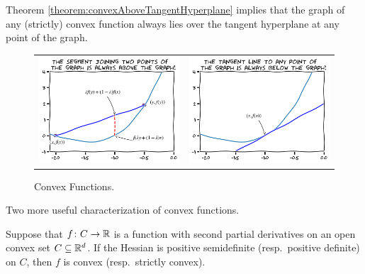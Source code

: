 \begin{remark}
Theorem \ref{theorem:convexAboveTangentHyperplane} implies that the graph of any (strictly) convex function always lies over the tangent hyperplane at any point of the graph.
\begin{figure}[ht!]
\begin{tabular}{cc}
\includegraphics[width=0.5\linewidth]{convexFunction1.png} &
\includegraphics[width=0.5\linewidth]{convexFunction2.png}
\end{tabular}
\caption{Convex Functions.}
\label{figure:convexFunction}
\end{figure}
\end{remark}

Two more useful characterization of convex functions.
\begin{theorem}\label{theorem:Hess4Convex}
Suppose that $f\colon C \to \mathbb{R}$ is a function with second partial derivatives on an open convex set $C \subseteq \mathbb{R}^d$.  If the Hessian is positive semidefinite (resp.~positive definite) on $C$, then $f$ is convex (resp.~strictly convex).
\end{theorem}

